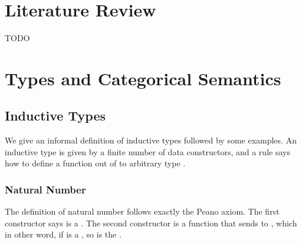 % 
% 

\section{Literature Review}

TODO

\section{Types and Categorical Semantics}

\subsection{Inductive Types}

We give an informal definition of inductive types followed by some examples. An inductive type  is given by a finite number of data constructors, and a rule says how to define a function out of  to arbitrary type .

\subsubsection*{Natural Number}

The definition of natural number  follows exactly the Peano axiom. The first constructor says  is a . The second constructor is a function that sends  to , which in other word, if  is a , so is the . 

